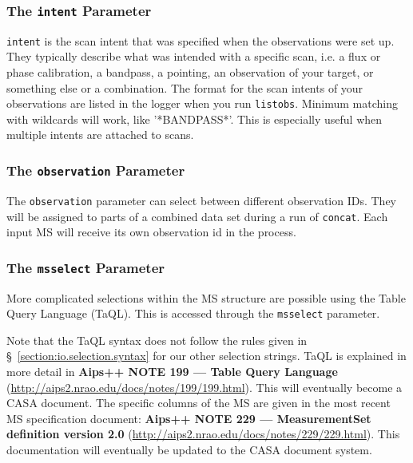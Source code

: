 \subsubsection{The {\tt intent} Parameter}
\label{section:io.selection.selectdata.intent}

{\tt intent} is the scan intent that was specified when
the observations were set up. They typically describe what was
intended with a specific scan, i.e. a flux or phase calibration, a
bandpass, a pointing, an observation of your target, or something else
or a combination. The format for the scan intents of your observations
are listed in the logger when you run {\tt listobs}. Minimum matching
with wildcards will work, like '*BANDPASS*'. This is especially useful
when multiple intents are attached to scans.

\subsubsection{The {\tt observation} Parameter}
\label{section:io.selection.selectdata.observation}

The {\tt observation} parameter can select between different
observation IDs. They will be assigned to parts of a combined data set during a
run of {\tt concat}. Each input MS will receive its own observation id
in the process. 


\subsubsection{The {\tt msselect} Parameter}
\label{section:io.selection.selectdata.msselect}

More complicated selections within the MS structure are possible
using the Table Query Language (TaQL).  This is accessed through
the {\tt msselect} parameter.

Note that the TaQL syntax does not follow the rules given in 
\S~\ref{section:io.selection.syntax} for our other selection strings.
TaQL is explained in more detail in {\bf Aips++ NOTE 199 --- 
Table Query Language}
(\url{http://aips2.nrao.edu/docs/notes/199/199.html}).
This will eventually become a CASA document.  The specific 
columns of the MS are given in the most recent MS specification
document: {\bf Aips++ NOTE 229 --- MeasurementSet definition version 2.0}
(\url{http://aips2.nrao.edu/docs/notes/229/229.html}).
This documentation will eventually be updated to the CASA 
document system.

